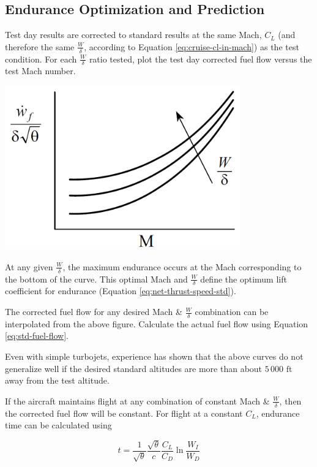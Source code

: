 \documentclass[
]{book}
\begin{document}
\hypertarget{endurance-optimization-and-prediction-1}{%
\subsection{Endurance Optimization and Prediction}\label{endurance-optimization-and-prediction-1}}

Test day results are corrected to standard results at the same Mach, \(C_L\)
(and therefore the same \(\frac{W}{\delta}\), according to Equation
\eqref{eq:cruise-cl-in-mach}) as the test condition. For each \(\frac{W}{\delta}\)
ratio tested, plot the test day corrected fuel flow versus the test Mach number.

\includegraphics[width=4in,height=\textheight]{media/12/test-corr-fuel-flow-m-curve.png}~

At any given \(\frac{W}{\delta}\), the maximum endurance occurs at the Mach
corresponding to the bottom of the curve. This optimal Mach and
\(\frac{W}{\delta}\) define the optimum lift coefficient for endurance
(Equation \eqref{eq:net-thrust-speed-std}).

The corrected fuel flow for any desired Mach \& \(\frac{W}{\delta}\) combination
can be interpolated from the above figure. Calculate the actual fuel flow using
Equation \eqref{eq:std-fuel-flow}.

Even with simple turbojets, experience has shown that the above curves do not
generalize well if the desired standard altitudes are more than about
\(5\,000 \text{ ft}\) away from the test altitude.

If the aircraft maintains flight at any combination of constant Mach \&
\(\frac{W}{\delta}\), then the corrected fuel flow will be constant. For flight
at a constant \(C_L\), endurance time can be calculated using

\[
t = \frac{1}{\sqrt{\theta}} \frac{\sqrt{\theta}}{c} \frac{C_L}{C_D} \ln \frac{W_I}{W_D}
\label{eq:endur-time-cl}
\]
\end{document}
